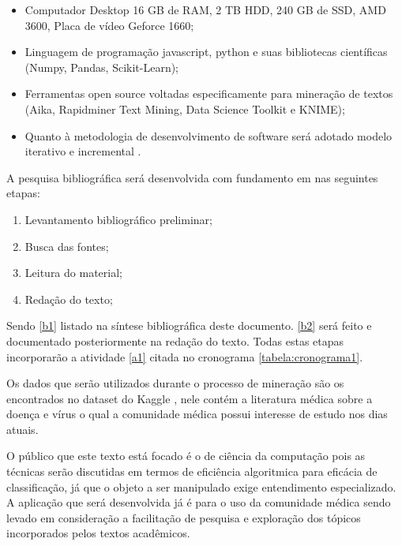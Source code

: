 \documentclass[
	12pt,				%
	a4paper,			%
	english,			%
	brazil,				%
	]{article}
\begin{document}
    \begin{itemize}
        \item Computador Desktop 16 GB de RAM, 2 TB HDD, 240 GB de SSD, AMD 3600, Placa de v\' ideo Geforce 1660;
        \item Linguagem de programa\c c\~ ao javascript, python e suas bibliotecas cient\' ificas (Numpy, Pandas, Scikit-Learn);
        \item Ferramentas open source voltadas especificamente para minera\c c\~ ao de textos (Aika, Rapidminer Text Mining, Data Science Toolkit e KNIME);
        \item Quanto à metodologia de desenvolvimento de software ser\' a adotado modelo iterativo e incremental \cite{pressman2016engenharia}.
    \end{itemize}

   A pesquisa bibliogr\' afica ser\' a desenvolvida com fundamento em \cite{lakatos2001metodologia} nas seguintes etapas:
   \begin{enumerate}
        \item Levantamento bibliogr\' afico preliminar; \label{b1}
        \item Busca das fontes; \label{b2}
        \item Leitura do material; \label{b3}
        \item Reda\c c\~ ao do texto; \label{b4}
   \end{enumerate}
   
   Sendo \ref{b1} listado na síntese bibliogr\' afica deste documento. \ref{b2} ser\' a feito e documentado posteriormente na reda\c c\~ ao do texto. Todas estas etapas incorporar\~ ao a atividade \ref{a1} citada no cronograma \ref{tabela:cronograma1}.

    Os dados que ser\~ ao utilizados durante o processo de minera\c c\~ ao s\~ ao os encontrados no dataset do Kaggle \cite{kaggle20online}, nele contém a literatura médica sobre a doen\c ca e vírus o qual a comunidade médica possui interesse de estudo nos dias atuais.

    O público que este texto est\' a focado é o de ciência da computa\c c\~ ao pois as técnicas ser\~ ao discutidas em termos de eficiência algoritmica para efic\' acia de classifica\c c\~ ao, j\' a que o objeto a ser manipulado exige entendimento especializado. A aplica\c c\~ ao que ser\' a desenvolvida j\' a é para o uso da comunidade médica sendo levado em considera\c c\~ ao a facilita\c c\~ ao de pesquisa e explora\c c\~ ao dos tópicos incorporados pelos textos acadêmicos.
\end{document}
